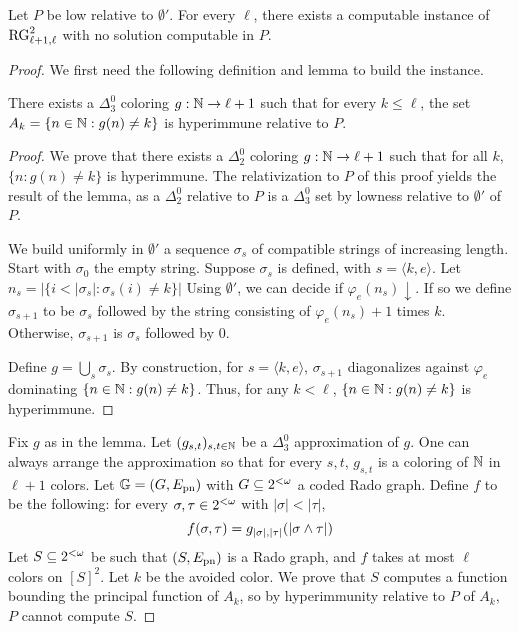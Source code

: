 \begin{theorem}\label{th:rg2-no-low-over-zp}
  Let $P$ be low relative to $\emptyset'$. For every $\ell$, there exists a computable instance of $\mathrm{RG}^2_{\ell+1,\ell}$ with no solution computable in $P$.
\end{theorem}
\begin{proof}
  We first need the following definition and lemma to build the instance.
  \begin{lemma}
    There exists a $\Delta^0_3$ coloring $g:\mathbb{N}\to\ell+1$ such that for every $k\leq\ell$, the set $A_k=\{n\in\mathbb{N}:g(n)\neq k\}$ is hyperimmune relative to $P$.
  \end{lemma}
  \begin{proof}
    We prove that there exists a $\Delta^0_2$ coloring $g:\mathbb{N}\to\ell+1$ such that for all $k$, $\{n:g(n)\neq k\}$ is hyperimmune. The relativization to $P$ of this proof yields the result of the lemma, as a $\Delta^0_2$ relative to $P$ is a $\Delta^0_3$ set by lowness relative to $\emptyset'$ of $P$.

    We build uniformly in $\emptyset'$ a sequence $\sigma_s$ of compatible strings of increasing length. Start with $\sigma_0$ the empty string. Suppose $\sigma_s$ is defined, with $s=\langle k,e\rangle$. Let $n_s=|\{i<|\sigma_s|:\sigma_s(i)\neq k\}|$ Using $\emptyset'$, we can decide if $\varphi_e(n_s)\downarrow$. If so we define $\sigma_{s+1}$ to be $\sigma_s$ followed by the string consisting of $\varphi_e(n_s)+1$ times $k$. Otherwise, $\sigma_{s+1}$ is $\sigma_s$ followed by $0$.

    Define $g=\bigcup_s \sigma_s$. By construction, for $s=\langle k, e\rangle$, $\sigma_{s+1}$ diagonalizes against $\varphi_e$ dominating $\{n\in\mathbb{N}:g(n)\neq k\}$. Thus, for any $k<\ell$, $\{n\in\mathbb{N}:g(n)\neq k\}$ is hyperimmune.
  \end{proof}
  Fix $g$ as in the lemma. Let $(g_{s,t})_{s,t\in\mathbb{N}}$ be a $\Delta^0_3$ approximation of $g$. One can always arrange the approximation so that for every $s,t$, $g_{s,t}$ is a coloring of $\mathbb{N}$ in $\ell+1$ colors.
  Let $\mathbb{G}=(G, E_{\mathrm{pn}})$ with $G\subseteq{2^{<\omega}}$ a coded Rado graph. Define $f$ to be the following: for every $\sigma,\tau\in{2^{<\omega}}$ with $|\sigma|<|\tau|$,
  \[ f(\sigma,\tau)=g_{|\sigma|,|\tau|}(|\sigma\wedge\tau|)\]
  Let $S\subseteq{2^{<\omega}}$ be such that $(S,E_{\mathrm{pn}})$ is a Rado graph, and $f$ takes at most $\ell$ colors on $[S]^2$. Let $k$ be the avoided color. We prove that $S$ computes a function bounding the principal function of $A_k$, so by hyperimmunity relative to $P$ of $A_k$, $P$ cannot compute $S$.


\end{proof}
